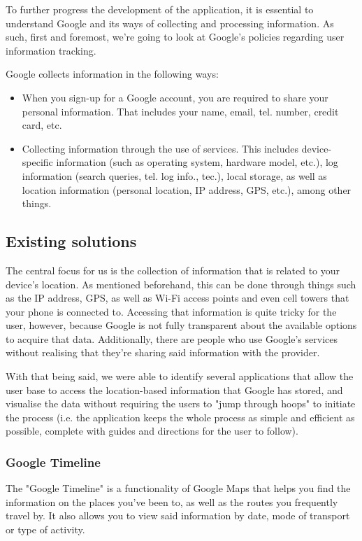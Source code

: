 \documentclass[12p]{article}
\begin{document}
To further progress the development of the application, it is essential to understand Google and its ways of collecting and processing information. As such, first and foremost, we’re going to look at Google’s policies regarding user information tracking.

Google collects information in the following ways\cite{GooglePrivacyPolicy}:

\begin{itemize}
    \item When you sign-up for a Google account, you are required to share your personal information. That includes your name, email, tel. number, credit card, etc.
    \item Collecting information through the use of services. This includes device-specific information (such as operating system, hardware model, etc.), log information (search queries, tel. log info., tec.), local storage, as well as location information (personal location, IP address, GPS, etc.), among other things.
\end{itemize}

\subsection{Existing solutions}
The central focus for us is the collection of information that is related to your device's location. As mentioned beforehand, this can be done through things such as the IP address, GPS, as well as Wi-Fi access points and even cell towers that your phone is connected to. Accessing that information is quite tricky for the user, however, because Google is not fully transparent about the available options to acquire that data. Additionally, there are people who use Google's services without realising that they're sharing said information with the provider.

With that being said, we were able to identify several applications that allow the user base to access the location-based information that Google has stored, and visualise the data without requiring the users to "jump through hoops" to initiate the process (i.e. the application keeps the whole process as simple and efficient as possible, complete with guides and directions for the user to follow).

\subsubsection{Google Timeline}

The "Google Timeline" is a functionality of Google Maps that helps you find the information on the places you've been to, as well as the routes you frequently travel by. It also allows you to view said information by date, mode of transport or type of activity.
\end{document}
